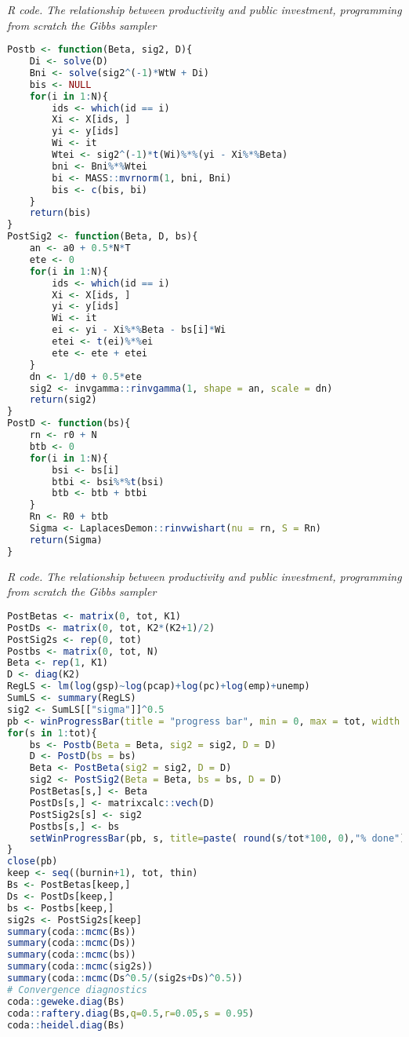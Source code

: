 \begin{enumerate}[leftmargin=*]
\begin{tcolorbox}[enhanced,width=4.67in,center upper,
	fontupper=\large\bfseries,drop shadow southwest,sharp corners]
	\textit{R code. The relationship between productivity and public investment, programming from scratch the Gibbs sampler}
	\begin{VF}
		\begin{lstlisting}[language=R]
Postb <- function(Beta, sig2, D){
	Di <- solve(D)
	Bni <- solve(sig2^(-1)*WtW + Di)
	bis <- NULL
	for(i in 1:N){
		ids <- which(id == i)
		Xi <- X[ids, ]
		yi <- y[ids]
		Wi <- it
		Wtei <- sig2^(-1)*t(Wi)%*%(yi - Xi%*%Beta)
		bni <- Bni%*%Wtei
		bi <- MASS::mvrnorm(1, bni, Bni)
		bis <- c(bis, bi)
	}
	return(bis)
}
PostSig2 <- function(Beta, D, bs){
	an <- a0 + 0.5*N*T
	ete <- 0
	for(i in 1:N){
		ids <- which(id == i)
		Xi <- X[ids, ]
		yi <- y[ids]
		Wi <- it
		ei <- yi - Xi%*%Beta - bs[i]*Wi
		etei <- t(ei)%*%ei
		ete <- ete + etei
	}
	dn <- 1/d0 + 0.5*ete 
	sig2 <- invgamma::rinvgamma(1, shape = an, scale = dn)
	return(sig2)
}
PostD <- function(bs){
	rn <- r0 + N
	btb <- 0
	for(i in 1:N){
		bsi <- bs[i]
		btbi <- bsi%*%t(bsi)
		btb <- btb + btbi
	}
	Rn <- R0 + btb
	Sigma <- LaplacesDemon::rinvwishart(nu = rn, S = Rn)
	return(Sigma)
}\end{lstlisting}
	\end{VF}
\end{tcolorbox}

\begin{tcolorbox}[enhanced,width=4.67in,center upper,
	fontupper=\large\bfseries,drop shadow southwest,sharp corners]
	\textit{R code. The relationship between productivity and public investment, programming from scratch the Gibbs sampler}
	\begin{VF}
		\begin{lstlisting}[language=R]
PostBetas <- matrix(0, tot, K1)
PostDs <- matrix(0, tot, K2*(K2+1)/2)
PostSig2s <- rep(0, tot)
Postbs <- matrix(0, tot, N)
Beta <- rep(1, K1)
D <- diag(K2)
RegLS <- lm(log(gsp)~log(pcap)+log(pc)+log(emp)+unemp)
SumLS <- summary(RegLS)
sig2 <- SumLS[["sigma"]]^0.5
pb <- winProgressBar(title = "progress bar", min = 0, max = tot, width = 300)
for(s in 1:tot){
	bs <- Postb(Beta = Beta, sig2 = sig2, D = D)
	D <- PostD(bs = bs)
	Beta <- PostBeta(sig2 = sig2, D = D)
	sig2 <- PostSig2(Beta = Beta, bs = bs, D = D)
	PostBetas[s,] <- Beta
	PostDs[s,] <- matrixcalc::vech(D)
	PostSig2s[s] <- sig2
	Postbs[s,] <- bs
	setWinProgressBar(pb, s, title=paste( round(s/tot*100, 0),"% done"))
}
close(pb)
keep <- seq((burnin+1), tot, thin)
Bs <- PostBetas[keep,]
Ds <- PostDs[keep,]
bs <- Postbs[keep,]
sig2s <- PostSig2s[keep]
summary(coda::mcmc(Bs))
summary(coda::mcmc(Ds))
summary(coda::mcmc(bs))
summary(coda::mcmc(sig2s))
summary(coda::mcmc(Ds^0.5/(sig2s+Ds)^0.5))
# Convergence diagnostics
coda::geweke.diag(Bs)
coda::raftery.diag(Bs,q=0.5,r=0.05,s = 0.95)
coda::heidel.diag(Bs)\end{lstlisting}
	\end{VF}
\end{tcolorbox}



\end{enumerate}
